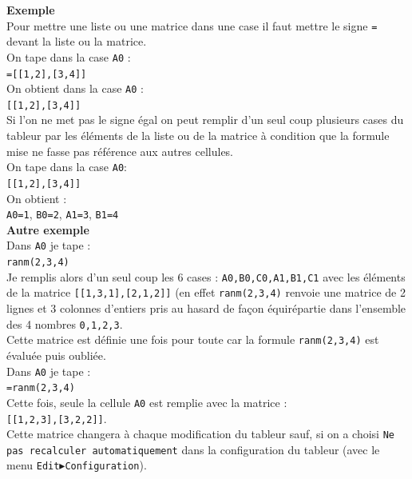 \documentclass[a4paper,11pt]{book}
\begin{document}
\begin{itemize}
{\bf Exemple}\\
 Pour mettre une liste ou une matrice dans une case il 
faut mettre le signe {\tt =} devant la liste ou la matrice.\\ 
On tape dans la case {\tt A0} :\\
{\tt =[[1,2],[3,4]]}\\
On obtient dans la case {\tt A0} :\\
{\tt [[1,2],[3,4]]}\\
Si l'on ne met pas le signe \'egal on peut remplir d'un seul coup plusieurs 
cases du tableur par les \'el\'ements de la liste ou de la matrice  \`a 
condition que la formule mise ne fasse pas r\'ef\'erence aux autres cellules.\\
On tape dans la case {\tt A0}:\\
{\tt [[1,2],[3,4]]}\\
On obtient :\\
{\tt A0=1}, {\tt B0=2}, {\tt A1=3}, {\tt B1=4}\\
{\bf Autre exemple}\\
Dans {\tt A0} je tape :\\
{\tt ranm(2,3,4)}\\
Je remplis alors d'un seul coup les 6 cases : {\tt A0,B0,C0,A1,B1,C1} avec  
les \'el\'ements de la matrice {\tt [[1,3,1],[2,1,2]]} (en effet 
{\tt ranm(2,3,4)} renvoie une matrice de 2 lignes et 3 colonnes 
d'entiers pris au hasard de fa\c{c}on \'equir\'epartie dans l'ensemble des 4 
nombres {\tt 0,1,2,3}.\\
Cette matrice est d\'efinie une fois pour toute car la formule 
{\tt ranm(2,3,4)} est \'evalu\'ee puis oubli\'ee.\\
Dans {\tt A0} je tape :\\
{\tt =ranm(2,3,4)}\\
Cette fois, seule la cellule {\tt A0} est remplie avec la matrice :\\
{\tt [[1,2,3],[3,2,2]]}.\\
Cette matrice changera \`a chaque modification du tableur sauf, si on a 
choisi {\tt Ne pas recalculer automatiquement} dans la configuration du tableur
(avec le menu {\tt Edit$\blacktriangleright$Configuration}).
\end{itemize}
\end{document}
